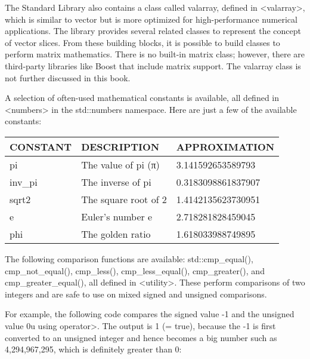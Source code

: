 The Standard Library also contains a class called valarray, defined in <valarray>, which is similar to vector but is more optimized for high-performance numerical applications. The library provides several related classes to represent the concept of vector slices. From these building blocks, it is possible to build classes to perform matrix mathematics. There is no built-in matrix class; however, there are third-party libraries like Boost that include matrix support. The valarray class is not further discussed in this book.

A selection of often-used mathematical constants is available, all defined in <numbers> in the std::numbers namespace. Here are just a few of the available constants:

\begin{longtable}{|l|l|l|}
\hline
\textbf{CONSTANT} & \textbf{DESCRIPTION} & \textbf{APPROXIMATION} \\ \hline
\endfirsthead
%
\endhead
%
pi                & The value of pi (π)  & 3.141592653589793      \\ \hline
inv\_pi           & The inverse of pi    & 0.3183098861837907     \\ \hline
sqrt2             & The square root of 2 & 1.4142135623730951     \\ \hline
e                 & Euler’s number e     & 2.718281828459045      \\ \hline
phi               & The golden ratio     & 1.618033988749895      \\ \hline
\end{longtable}




The following comparison functions are available: std::cmp\_equal(), cmp\_not\_equal(), cmp\_less(), cmp\_less\_equal(), cmp\_greater(), and cmp\_greater\_equal(), all defined in <utility>. These perform comparisons of two integers and are safe to use on mixed signed and unsigned comparisons.

For example, the following code compares the signed value -1 and the unsigned value 0u using operator>. The output is 1 (= true), because the -1 is first converted to an unsigned integer and hence becomes a big number such as 4,294,967,295, which is definitely greater than 0:

